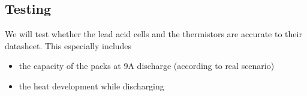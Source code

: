 \subsection{Testing}
We will test whether the lead acid cells and the thermistors are accurate to their datasheet. This especially includes \begin{itemize}
    \item the capacity of the packs at 9A discharge (according to real scenario)
    \item the heat development while discharging
\end{itemize}

